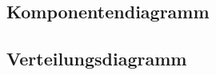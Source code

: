\subsection*{Komponentendiagramm}
\begin{figure}[h!]
	\centering
	\label{fig:CompDia}
\end{figure}

\vfill

\subsection*{Verteilungsdiagramm}
\begin{figure}[h!]
	\centering
	\label{fig:VerteilungsDia}
\end{figure}